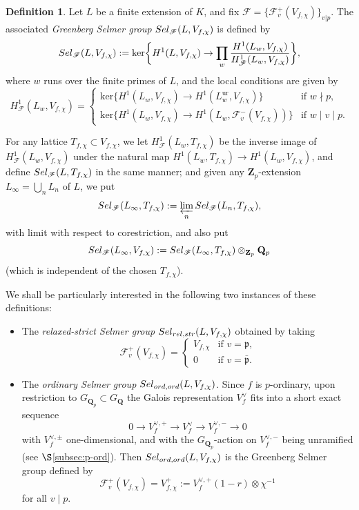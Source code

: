 \documentclass[10pt,letterpaper]{amsart}
\theoremstyle{plain}
\theoremstyle{definition}
\newtheorem{defn}[thm]{Definition}
\theoremstyle{definition}
\theoremstyle{plain}
\theoremstyle{plain}
\theoremstyle{plain}
\theoremstyle{remark}
\numberwithin{equation}{section}
\newcommand{\Sel}{Sel}
\newcommand{\pp}{\mathfrak{p}}
\newcommand{\ppbar}{\bar{\mathfrak{p}}}
\newcommand{\relstr}{{{\rm rel},{\rm str}}}
\newcommand{\ord}{{{\rm ord},{\rm ord}}}
\DeclareMathOperator{\ur}{\mathrm{ur}}
\newcommand{\Q}{\mathbf{Q}}
\newcommand{\Z}{\mathbf{Z}}
\def\Sel{{\rm Sel}}
\begin{document}
\begin{defn}
Let $L$ be a finite extension of $K$, and fix $\mathscr{F}=\{\mathscr{F}_v^+(V_{f,\chi})\}_{v\vert p}$. The associated \emph{Greenberg Selmer group} $\Sel_{\mathscr{F}}(L,V_{f,\chi})$ is defined by 
\begin{equation*}
    \Sel_{\mathscr{F}}(L,V_{f,\chi}):={{\mathrm{ker}}}\biggl\{H^1(L,V_{f,\chi})\rightarrow\prod_{w}\frac{H^1(L_w,V_{f,\chi})}{H^1_{\mathscr{F}}(L_w,V_{f,\chi})}
    \biggr\},
\end{equation*}
where $w$ runs over the finite primes of $L$, and the local conditions are given by
\[
H^1_{\mathscr{F}}(L_w,V_{f,\chi})=\begin{cases}
{{\mathrm{ker}}}\bigl\{H^1(L_w,V_{f,\chi})\rightarrow H^1(L_{w}^{\ur},V_{f,\chi})\bigr\} & \textrm {if $w\nmid p$},  \\[0.3em]
{{\mathrm{ker}}}\bigl\{H^1(L_w,V_{f,\chi})\rightarrow H^1(L_{w},\mathscr{F}_{v}^-(V_{f,\chi}))\bigr\} & \textrm{if $w\mid v\mid p$}.   
\end{cases}
\]

For any lattice $T_{f,\chi}\subset V_{f,\chi}$, we let $H^1_{\mathscr{F}}(L_w,T_{f,\chi})$ be the inverse image of $H^1_{\mathscr{F}}(L_w,V_{f,\chi})$ under the natural map $H^1(L_w,T_{f,\chi})\rightarrow H^1(L_w,V_{f,\chi})$, and define $\Sel_{\mathscr{F}}(L,T_{f,\chi})$ in the same manner; and given any $\Z_p$-extension $L_\infty=\bigcup_nL_n$ of $L$, we put
\[
\Sel_{\mathscr{F}}(L_\infty,T_{f,\chi}):=\varprojlim_n\Sel_{\mathscr{F}}(L_n,T_{f,\chi}),
\]
with limit with respect to corestriction, and also put 
\[\Sel_{\mathscr{F}}(L_\infty,V_{f,\chi}):=
\Sel_{\mathscr{F}}(L_\infty,T_{f,\chi})\otimes_{\Z_p}\Q_p\] (which is independent of the chosen $T_{f,\chi}$).
\end{defn}

We shall be particularly interested in the following two instances of these definitions:
\begin{itemize}
    \item The \emph{relaxed-strict Selmer group} $\Sel_{\relstr}(L,V_{f,\chi})$ obtained by taking
    \[
    \mathscr{F}_v^+(V_{f,\chi})=\begin{cases}
    V_{f,\chi}&\textrm{if $v=\pp$,}\\[0.3em]
    0&\textrm{if $v=\ppbar$.}
    \end{cases}
    \]
    \item The \emph{ordinary Selmer group} $\Sel_{\ord}(L,V_{f,\chi})$. Since $f$ is $p$-ordinary, upon restriction to $G_{\Q_p}\subset G_{\Q}$ the Galois representation $V_f^\vee$ fits into a short exact sequence
    \[
    0\rightarrow V_f^{\vee,+}\rightarrow V_f^\vee\rightarrow V_f^{\vee,-}\rightarrow 0
    \]
    with $V_{f}^{\vee,\pm}$ one-dimensional, and with the $G_{\Q_p}$-action on $V_{f}^{\vee,-}$ being unramified (see $\S$\ref{subsec:p-ord}). Then $\Sel_{\ord}(L,V_{f,\chi})$ is the Greenberg Selmer group defined by
    \begin{equation}\label{eq:fil+}
    \mathscr{F}_v^+(V_{f,\chi})=V_{f,\chi}^+:=V_f^{\vee,+}(1-r)\otimes\chi^{-1}
    \end{equation}
    for all $v\mid p$. 
\end{itemize}
\end{document}
